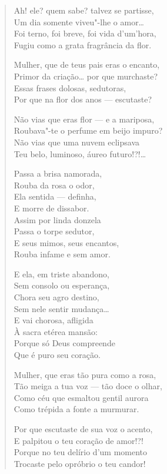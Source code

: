 \begin{verse}
Ah! ele? quem sabe? talvez se partisse,\\
Um dia somente viveu"-lhe o amor\ldots{}\\
Foi terno, foi breve, foi vida d'um'hora,\\
Fugiu como a grata fragrância da flor.

Mulher, que de teus pais eras o encanto,\\
Primor da criação\ldots{} por que murchaste?\\
Essas frases dolosas, sedutoras,\\
Por que na flor dos anos --- escutaste?

Não vias que eras flor --- e a mariposa,\\
Roubava"-te o perfume em beijo impuro?\\
Não vias que uma nuvem eclipsava\\
Teu belo, luminoso, áureo futuro!?!\ldots{}

Passa a brisa namorada,\\
Rouba da rosa o odor,\\
Ela sentida --- definha,\\
E morre de dissabor.\\
Assim por linda donzela\\
Passa o torpe sedutor,\\
E seus mimos, seus encantos,\\
Rouba infame e sem amor.

E ela, em triste abandono,\\
Sem consolo ou esperança,\\
Chora seu agro destino,\\
Sem nele sentir mudança\ldots{}\\
E vai chorosa, afligida\\
À sacra etérea mansão:\\
Porque só Deus compreende\\
Que é puro seu coração.

Mulher, que eras tão pura como a rosa,\\
Tão meiga a tua voz --- tão doce o olhar,\\
Como céu que esmaltou gentil aurora\\
Como trépida a fonte a murmurar.

Por que escutaste de sua voz o acento,\\
E palpitou o teu coração de amor!?!\\
Porque no teu delírio d'um momento\\
Trocaste pelo opróbrio o teu candor!


\end{verse}
